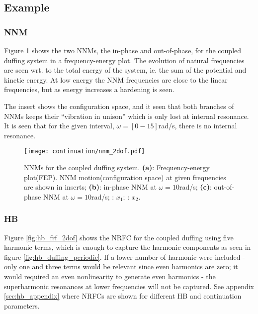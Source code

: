 \subsection{Example}
\label{sec:cont_example}

\subsubsection{NNM}

Figure \ref{fig:nnm_2dof} shows the two NNMs, the in-phase and out-of-phase, for
the coupled duffing system in a frequency-energy plot.
The evolution of natural frequencies are seen wrt. to the total energy of the
system, ie. the sum of the potential and kinetic energy. At low energy the NNM
frequencies are close to the linear frequencies, but as energy increases a
hardening is seen.

The insert shows the configuration space, and it seen that both branches of NNMs
keeps their ``vibration in unison'' which is only lost at internal resonance. It
is seen that for the given interval, $\omega=[0-15]$rad/s, there is no internal
resonance.


\begin{figure}[!ht]
  \centering
  \texttt{[image: continuation/nnm\_2dof.pdf]}
  \caption{NNMs for the coupled duffing system.
    \textbf{(a)}: Frequency-energy plot(FEP). NNM motion(configuration space) at
    given frequencies are shown in inserts;
    \textbf{(b)}: in-phase NNM at $\omega=10$rad/s;
    \textbf{(c)}: out-of-phase NNM at $\omega=10$rad/s;
    \sampleline{}: $x_1$;
    \textcolor{orange}{}: $x_2$.
  }
  \label{fig:nnm_2dof}
 \end{figure}


\subsubsection{HB}

Figure \ref{fig:hb_frf_2dof} shows the NRFC for the coupled duffing using five
harmonic terms, which is enough to capture the harmonic components as seen in
figure \ref{fig:hb_duffing_periodic}. If a lower number of harmonic were
included - only one and three terms would be relevant since even harmonics are
zero; it would required an even nonlinearity to generate even harmonics - the
superharmonic resonances at lower frequencies will not be captured. See appendix
\ref{sec:hb_appendix} where NRFCs are shown for different HB and continuation
parameters.

